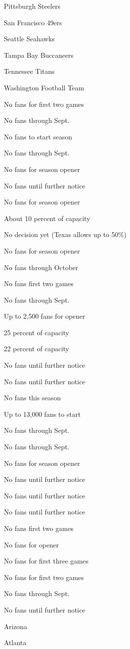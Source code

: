 Pittsburgh Steelers

San Francisco 49ers

Seattle Seahawks

Tampa Bay Buccaneers

Tennessee Titans

Washington Football Team

No fans for first two games

No fans through Sept.

No fans to start season

No fans through Sept.

No fans for season opener

No fans until further notice

No fans for season opener

About 10 percent of capacity

No decision yet (Texas allows up to 50\%)

No fans for season opener

No fans through October

No fans first two games

No fans through Sept.

Up to 2,500 fans for opener

25 percent of capacity

22 percent of capacity

No fans until further notice

No fans until further notice

No fans this season

Up to 13,000 fans to start

No fans through Sept.

No fans through Sept.

No fans for season opener

No fans until further notice

No fans until further notice

No fans until further notice

No fans first two games

No fans for opener

No fans for first three games

No fans for first two games

No fans through Sept.

No fans until further notice

Arizona

Atlanta

